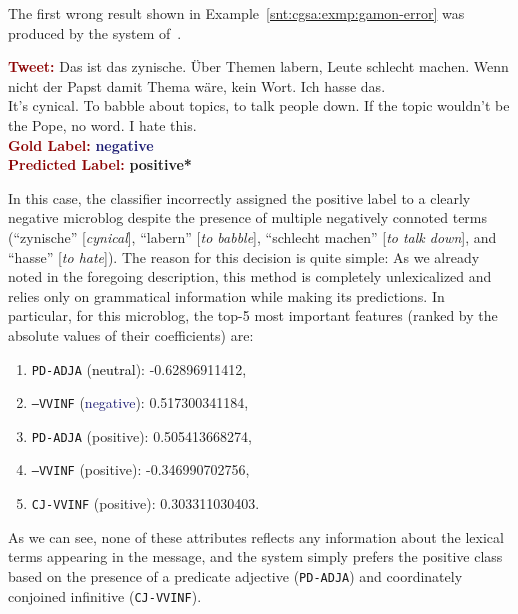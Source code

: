 The first wrong result shown in
Example~\ref{snt:cgsa:exmp:gamon-error} was produced by the system
of~\citet{Gamon:04}.
\begin{example}\label{snt:cgsa:exmp:mohammad-error}
  \noindent\textup{\bfseries\textcolor{darkred}{Tweet:}} {\upshape Das ist das zynische. \"Uber Themen labern, Leute schlecht machen. Wenn nicht der Papst damit Thema w\"are, kein Wort. Ich hasse das.}\\
  \noindent It's cynical.  To babble about topics, to talk people
  down.  If the topic wouldn't be the Pope, no word. I hate
  this.\\[\exampleSep]
  \noindent\textup{\bfseries\textcolor{darkred}{Gold Label:}}\hspace*{4.3em}\textbf{%
    \upshape\textcolor{midnightblue}{negative}}\\
 \noindent\textup{\bfseries\textcolor{darkred}{Predicted Label:}}\hspace*{2em}\textbf{%
    \upshape\textcolor{green3}{positive*}}\label{snt:cgsa:exmp:gamon-error}
\end{example}
\noindent{} In this case, the classifier incorrectly assigned the
positive label to a clearly negative microblog despite the presence of
multiple negatively connoted terms (``zynische'' [\emph{cynical}],
``labern'' [\emph{to babble}], ``schlecht machen'' [\emph{to talk
    down}], and ``hasse'' [\emph{to hate}]).  The reason for this
decision is quite simple: As we already noted in the foregoing
description, this method is completely unlexicalized and relies only
on grammatical information while making its predictions.  In
particular, for this microblog, the top-5 most important features
(ranked by the absolute values of their coefficients) are:
\begin{enumerate}
\item \texttt{PD-ADJA} (\textcolor{black}{neutral}): -0.62896911412,
\item \texttt{---VVINF} (\textcolor{midnightblue}{negative}): 0.517300341184,
\item \texttt{PD-ADJA} (\textcolor{green3}{positive}): 0.505413668274,
\item \texttt{---VVINF} (\textcolor{green3}{positive}): -0.346990702756,
\item \texttt{CJ-VVINF} (\textcolor{green3}{positive}):
  0.303311030403.
\end{enumerate}
As we can see, none of these attributes reflects any information about
the lexical terms appearing in the message, and the system simply
prefers the positive class based on the presence of a predicate
adjective (\texttt{PD-ADJA}) and coordinately conjoined infinitive
(\texttt{CJ-VVINF}).

